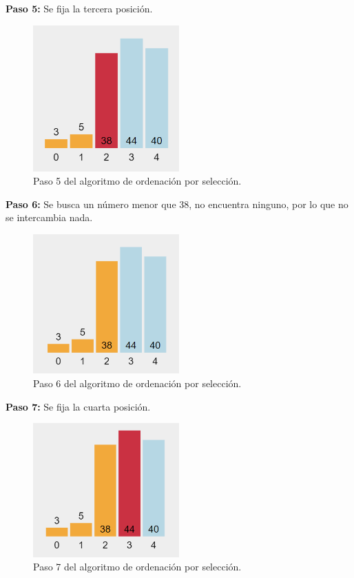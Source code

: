 \newpage
\textbf{Paso 5:} Se fija la tercera posición.

\begin{figure}[h!]  
    \centering
    \includegraphics[width=0.5\textwidth]{./Images/oe5.png}
    \caption{Paso 5 del algoritmo de ordenación por selección.}
    \label{fig:SelectionSort5}
\end{figure}

\textbf{Paso 6:} Se busca un número menor que 38, no encuentra ninguno, por lo que no se intercambia nada.

\begin{figure}[h!]  
    \centering
    \includegraphics[width=0.5\textwidth]{./Images/oe6.png}
    \caption{Paso 6 del algoritmo de ordenación por selección.}
    \label{fig:SelectionSort6}
\end{figure}

\newpage
\textbf{Paso 7:} Se fija la cuarta posición.

\begin{figure}[h!]  
    \centering
    \includegraphics[width=0.5\textwidth]{./Images/oe7.png}
    \caption{Paso 7 del algoritmo de ordenación por selección.}
    \label{fig:SelectionSort7}
\end{figure}

